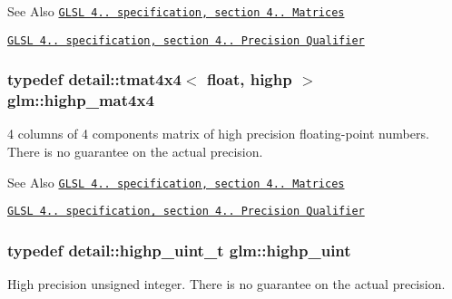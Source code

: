 \begin{DoxySeeAlso}{See Also}
\href{http://www.opengl.org/registry/doc/GLSLangSpec.4.20.8.pdf}{\tt G\-L\-S\-L 4.. specification, section 4.. Matrices} 

\href{http://www.opengl.org/registry/doc/GLSLangSpec.4.20.8.pdf}{\tt G\-L\-S\-L 4.. specification, section 4.. Precision Qualifier} 
\end{DoxySeeAlso}
\hypertarget{group__core__precision_ga231950d260be295a25d7340e2020f55c}{
\subsubsection[{highp\-\_\-mat4x4}]{\setlength{\rightskip}{0pt plus 5cm}typedef detail\-::tmat4x4$<$ float, highp $>$ {\bf glm\-::highp\-\_\-mat4x4}}}\label{group__core__precision_ga231950d260be295a25d7340e2020f55c}
4 columns of 4 components matrix of high precision floating-\/point numbers. There is no guarantee on the actual precision.

\begin{DoxySeeAlso}{See Also}
\href{http://www.opengl.org/registry/doc/GLSLangSpec.4.20.8.pdf}{\tt G\-L\-S\-L 4.. specification, section 4.. Matrices} 

\href{http://www.opengl.org/registry/doc/GLSLangSpec.4.20.8.pdf}{\tt G\-L\-S\-L 4.. specification, section 4.. Precision Qualifier} 
\end{DoxySeeAlso}
\hypertarget{group__core__precision_gabfd1cf11193324a5f77d3831b6ac3205}{
\subsubsection[{highp\-\_\-uint}]{\setlength{\rightskip}{0pt plus 5cm}typedef detail\-::highp\-\_\-uint\-\_\-t {\bf glm\-::highp\-\_\-uint}}}\label{group__core__precision_gabfd1cf11193324a5f77d3831b6ac3205}
High precision unsigned integer. There is no guarantee on the actual precision.

